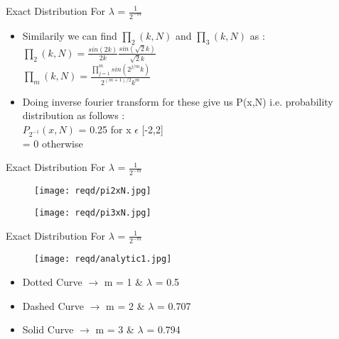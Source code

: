 \documentclass{beamer}
\begin{document}
\begin{frame}{Exact Distribution For $\lambda$ = $\frac{1}{2^{-m}}$}
	\begin{itemize}
	\setlength\itemsep{1em}
		\item{\large Similarily we can find $\prod_{2}(k,N)$ and $\prod_{3}(k,N)$ as :\\
		\vspace{1em} \hspace{5em}
		$\prod_{2}(k,N) = \frac{sin(2k)}{2k} \frac{sin(\sqrt{2}k)}{\sqrt{2}k}$\\
		\vspace{1em} \hspace{5em}
		$\prod_{m}(k,N) = \frac{\prod_{j=1}^{m}sin(2^{j/m}k)}{2^{(m+1)/2}k^{m}}$\\
		}
		\item{\large Doing inverse fourier transform for these give us P(x,N) i.e. probability distribution as follows :\\
		\vspace{1em} \hspace{5em}
			$P_{2^{-1}}(x,N)$ = 0.25 for x $\epsilon$ [-2,2]\\
		\vspace{1em} \hspace{9.9em}
			= 0 otherwise}
	\end{itemize}
\end{frame}

\begin{frame}{Exact Distribution For $\lambda$ = $\frac{1}{2^{-m}}$}
	\begin{figure}
    		\centering
    		\texttt{[image: reqd/pi2xN.jpg]}
	\end{figure}
		\begin{figure}
    		\centering
    		\texttt{[image: reqd/pi3xN.jpg]}
	\end{figure}
\end{frame}

\begin{frame}{Exact Distribution For $\lambda$ = $\frac{1}{2^{-m}}$}
	\begin{figure}
    		\centering
    		\texttt{[image: reqd/analytic1.jpg]}
	\end{figure}
	\begin{itemize}
		\item{\large Dotted Curve $\rightarrow$ m = 1  \&  $\lambda$ = 0.5}
		\item{\large Dashed Curve $\rightarrow$ m = 2  \&  $\lambda$ = 0.707}
		\item{\large Solid Curve $\rightarrow$ m = 3  \&  $\lambda$ = 0.794}
	\end{itemize}
\end{frame}
\end{document}
